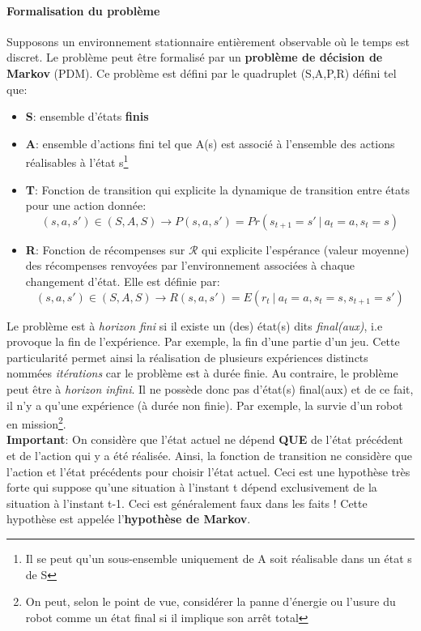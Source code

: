 \paragraph{Formalisation du problème}
Supposons un environnement stationnaire entièrement observable où le temps est discret. Le problème peut être formalisé par un \textbf{problème de décision de Markov} (PDM). Ce problème est défini par le quadruplet (S,A,P,R) défini tel que:
\begin{itemize}
    \item \textbf{S}: ensemble d'états \textbf{finis}
    \item \textbf{A}: ensemble d'actions fini tel que A(s) est associé à l'ensemble des actions réalisables à l'état s\footnote{Il se peut qu'un sous-ensemble uniquement de A soit réalisable dans un état s de S}
    \item \textbf{T}: Fonction de transition qui explicite la dynamique de transition entre états pour une action donnée:
    $$(s,a,s') \in (S,A,S) \rightarrow P(s,a,s')=Pr(s_{t+1}=s' \ | \ a_t=a,s_t=s)$$
    \item \textbf{R}: Fonction de récompenses sur $\mathcal{R}$ qui explicite l'espérance (valeur moyenne) des récompenses renvoyées par l'environnement associées à chaque changement d'état. Elle est définie par:
    $$(s,a,s') \in (S,A,S) \rightarrow R(s,a,s')=E(r_t \ | \ a_t=a,s_t=s,s_{t+1}=s')$$
\end{itemize}

\noindent Le problème est à \textit{horizon fini} si il existe un (des) état(s) dits \textit{final(aux)}, i.e provoque la fin de l'expérience. Par exemple, la fin d'une partie d'un jeu. Cette particularité permet ainsi la réalisation de plusieurs expériences distincts nommées \textit{itérations} car le problème est à durée finie. Au contraire, le problème peut être à \textit{horizon infini}. Il ne possède donc pas d'état(s) final(aux) et de ce fait, il n'y a qu'une expérience (à durée non finie). Par exemple, la survie d'un robot en mission\footnote{On peut, selon le point de vue, considérer la panne d'énergie ou l'usure du robot comme un état final si il implique son arrêt total}.\\

\noindent \textbf{Important}: On considère que l'état actuel ne dépend \textbf{QUE} de l'état précédent et de l'action qui y a été réalisée. Ainsi, la fonction de transition ne considère que l'action et l'état précédents pour choisir l'état actuel. Ceci est une hypothèse très forte qui suppose qu'une situation à l'instant t dépend exclusivement de la situation à l'instant t-1. Ceci est généralement faux dans les faits ! Cette hypothèse est appelée l'\textbf{hypothèse de Markov}.\\

